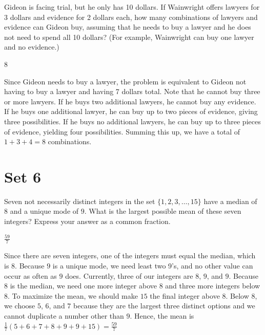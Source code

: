 \documentclass[11pt]{article}
\begin{document}
\begin{problem}
Gideon is facing trial, but he only has 10 dollars. If Wainwright offers lawyers for 3 dollars and evidence for 2 dollars each, how many combinations of lawyers and evidence can Gideon buy, assuming that he needs to buy a lawyer and he does not need to spend all 10 dollars? (For example, Wainwright can buy one lawyer and no evidence.)
\end{problem}

\begin{answer}
8
\end{answer}

\begin{solution}
Since Gideon needs to buy a lawyer, the problem is equivalent to Gideon not having to buy a lawyer and having 7 dollars total. Note that he cannot buy three or more lawyers. If he buys two additional lawyers, he cannot buy any evidence. If he buys one additional lawyer, he can buy up to two pieces of evidence, giving three possibilities. If he buys no additional lawyers, he can buy up to three pieces of evidence, yielding four possibilities. Summing this up, we have a total of $1+3+4=\boxed{8}$ combinations.
\end{solution}


\newpage
\section*{Set 6}
\begin{problem}
Seven not necessarily distinct integers in the set $\{1, 2, 3, \ldots, 15\}$ have a median of $8$ and a unique mode of $9$. What is the largest possible mean of these seven integers? Express your answer as a common fraction.%
\end{problem}

\begin{answer}
$\frac{59}{7}$
\end{answer}

\begin{solution}
Since there are seven integers, one of the integers must equal the median, which is $8$. Because $9$ is a unique mode, we need least two 9's, and no other value can occur as often as $9$ does. Currently, three of our integers are $8$, $9$, and $9$. Because $8$ is the median, we need one more integer above $8$ and three more integers below $8$. To maximize the mean, we should make $15$ the final integer above $8$. Below $8$, we choose $5$, $6$, and $7$ because they are the largest three distinct options and we cannot duplicate a number other than $9$. Hence, the mean is $\frac{1}{7}(5 + 6 + 7 + 8 + 9 + 9 + 15) = \boxed{\frac{59}{7}}$
\end{solution}
\end{document}
